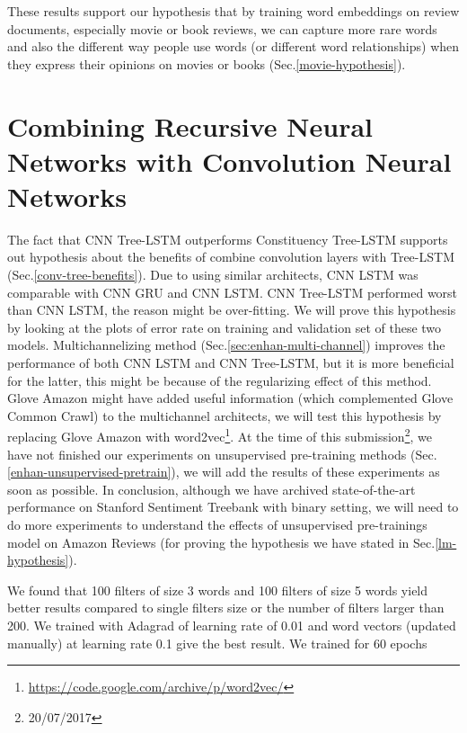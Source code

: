 These results support our hypothesis that by training word embeddings on review documents, especially movie or book reviews, we can capture more rare words and also the different way people use words (or different word relationships) when they express their opinions on movies or books (Sec.\ref{movie-hypothesis}).
 
\section{Combining Recursive Neural Networks with Convolution Neural Networks}
The fact that CNN Tree-LSTM outperforms Constituency Tree-LSTM\cite{treeLSTM} supports out hypothesis about the benefits of combine convolution layers with Tree-LSTM (Sec.\ref{conv-tree-benefits}).
Due to using similar architects, CNN LSTM was comparable with CNN GRU and CNN LSTM\cite{cnn-rnn}. 
CNN Tree-LSTM performed worst than CNN LSTM, the reason might be over-fitting.
We will prove this hypothesis by looking at the plots of error rate on training and validation set of these two models.
Multichannelizing method (Sec.\ref{sec:enhan-multi-channel}) improves the performance of both CNN LSTM and CNN Tree-LSTM, but it is more beneficial for the latter, this might be because of the regularizing effect of this method\cite{KimCNN}.
Glove Amazon might have added useful information (which complemented Glove Common Crawl) to the multichannel architects, we will test this hypothesis by replacing Glove Amazon with word2vec\footnote{\url{https://code.google.com/archive/p/word2vec/}}.
At the time of this submission\footnote{20/07/2017}, we have not finished our experiments on unsupervised pre-training methods (Sec.\ref{enhan-unsupervised-pretrain}), we will add the results of these experiments as soon as possible. 
In conclusion, although we have archived state-of-the-art performance on Stanford Sentiment Treebank with binary setting, we will need to do more experiments to understand the effects of unsupervised pre-trainings model on Amazon Reviews (for proving the hypothesis we have stated in Sec.\ref{lm-hypothesis}).

We found that 100 filters of size 3 words and 100 filters of size 5 words yield better results compared to single filters size or the number of filters larger than 200. We trained with Adagrad of learning rate of 0.01 and word vectors (updated manually) at learning rate 0.1 give the best result. We trained for 60 epochs









